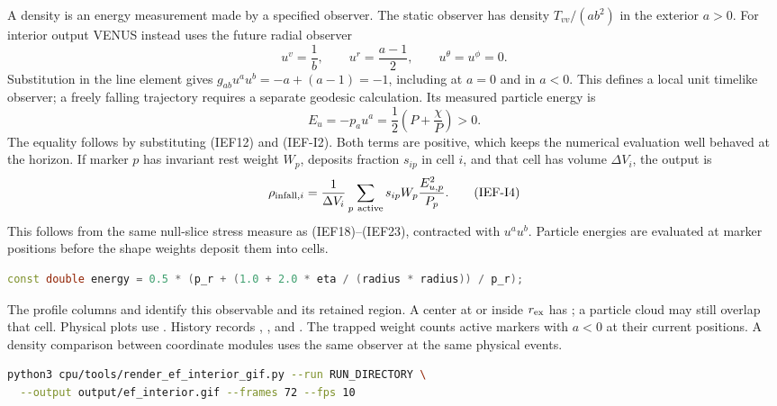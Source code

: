 A density is an energy measurement made by a specified observer. The
static observer has density \(T_{vv}/(ab^2)\) in the exterior \(a>0\).
For interior output VENUS instead uses the future radial observer
\[
 u^v=\frac1b,\qquad u^r=\frac{a-1}{2},\qquad
 u^\theta=u^\phi=0.                                    \tag{IEF-I2}
\]
Substitution in the line element gives
\(g_{ab}u^a u^b=-a+(a-1)=-1\), including at \(a=0\) and in \(a<0\).
This defines a local unit timelike observer; a freely falling trajectory
requires a separate geodesic calculation. Its measured particle energy is
\[
 E_u=-p_a u^a=\frac12\left(P+\frac\chi P\right)>0.       \tag{IEF-I3}
\]
The equality follows by substituting (IEF12) and (IEF-I2). Both terms are
positive, which keeps the numerical evaluation well behaved at the horizon.
If marker \(p\) has invariant rest weight \(W_p\), deposits fraction
\(s_{ip}\) in cell \(i\), and that cell has volume \(\Delta V_i\), the output is
\[
 \rho_{{\rm infall},i}
 =\frac1{\Delta V_i}\sum_{p\ {\rm active}}
           s_{ip}W_p\frac{E_{u,p}^2}{P_p}.              \tag{IEF-I4}
\]
This follows from the same null-slice stress measure as (IEF18)--(IEF23),
contracted with \(u^a u^b\). Particle energies are evaluated at marker
positions before the shape weights deposit them into cells.

\begin{lstlisting}[language=C++]
const double energy = 0.5 * (p_r + (1.0 + 2.0 * eta / (radius * radius)) / p_r);
\end{lstlisting}

The profile columns  and  identify this
observable and its retained region. A center at or inside \(r_{\rm ex}\)
has ; a particle cloud may still overlap that cell.
Physical plots use . History records
, , and
. The trapped weight counts active markers with
\(a<0\) at their current positions. A density comparison between coordinate
modules uses the same observer at the same physical events.

\begin{lstlisting}[language=bash]
python3 cpu/tools/render_ef_interior_gif.py --run RUN_DIRECTORY \
  --output output/ef_interior.gif --frames 72 --fps 10
\end{lstlisting}

